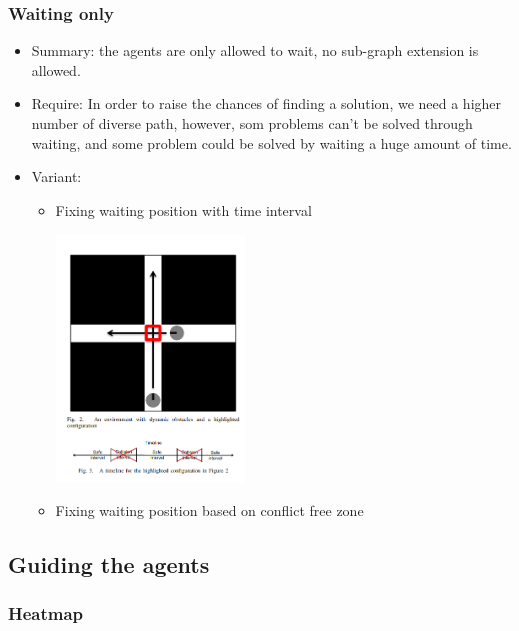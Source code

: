 \subsubsection{Waiting only}
\begin{itemize}
  \item Summary: the agents are only allowed to wait, no sub-graph extension is allowed.
  \item Require: In order to raise the chances of finding a solution, we need a higher number of diverse path, however, som problems can't  be solved through waiting, and some problem could be solved by waiting a huge amount of time. 
  \item Variant:\begin{itemize}
    \item Fixing waiting position with time interval\cite{phli11a,naphli12a}
    
    
    \includegraphics[width=5cm]{img/safeinterval.png}
    \item Fixing waiting position based on conflict free zone
  \end{itemize} 
\end{itemize}



\subsection{Guiding the agents}
\subsubsection{Heatmap}


